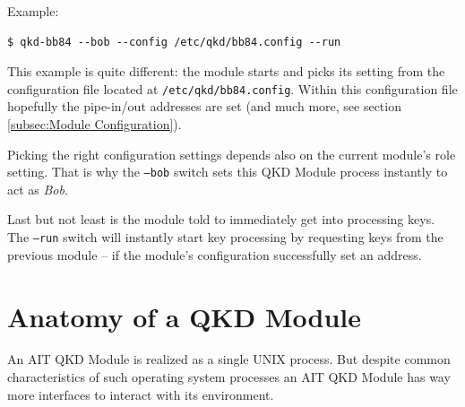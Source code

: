 \medskip

\noindent Example:

\begin{minipage}{0.9\textwidth}
\bigskip
\begin{verbatim}
$ qkd-bb84 --bob --config /etc/qkd/bb84.config --run
\end{verbatim}
\medskip
\end{minipage}

This example is quite different: the module starts and picks its setting from the configuration file located at \texttt{/etc/qkd/bb84.config}. Within this configuration file hopefully the pipe-in/out addresses are set (and much more, see section \ref{subsec:Module Configuration}).

\medskip

Picking the right configuration settings depends also on the current module's role setting. That is why the \texttt{--bob} switch sets this QKD Module process instantly to act as \emph{Bob}.

\medskip

Last but not least is the module told to immediately get into processing keys. The \texttt{--run} switch will instantly start key processing by requesting keys from the previous module -- if the module's configuration successfully set an address.


\section{Anatomy of a QKD Module}
\label{sec:Anatomy of a QKD Module}

An AIT QKD Module is realized as a single UNIX process. But despite common characteristics of such operating system processes an AIT QKD Module has way more interfaces to interact with its environment.

